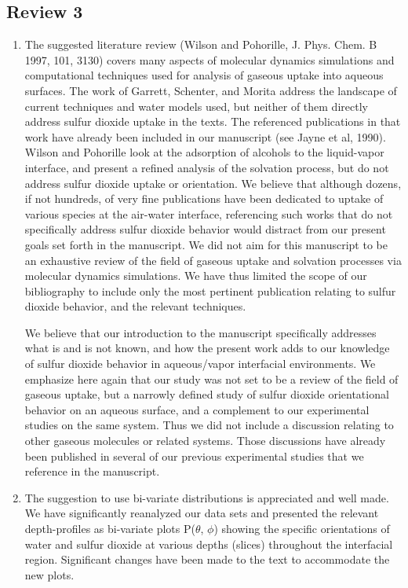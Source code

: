 \documentclass{article}
\begin{document}
\subsection*{Review 3}
\begin{enumerate}
\item The suggested literature review (Wilson and Pohorille, J. Phys. Chem. B 1997, 101, 3130) covers many aspects of molecular dynamics simulations and computational techniques used for analysis of gaseous uptake into aqueous surfaces. The work of Garrett, Schenter, and Morita address the landscape of current techniques and water models used, but neither of them directly address sulfur dioxide uptake in the texts. The referenced publications in that work have already been included in our manuscript (see Jayne et al, 1990). Wilson and Pohorille look at the adsorption of alcohols to the liquid-vapor interface, and present a refined analysis of the solvation process, but do not address sulfur dioxide uptake or orientation. We believe that although dozens, if not hundreds, of very fine publications have been dedicated to uptake of various species at the air-water interface, referencing such works that do not specifically address sulfur dioxide behavior would distract from our present goals set forth in the manuscript. We did not aim for this manuscript to be an exhaustive review of the field of gaseous uptake and solvation processes via molecular dynamics simulations. We have thus limited the scope of our bibliography to include only the most pertinent publication relating to sulfur dioxide behavior, and the relevant techniques.

We believe that our introduction to the manuscript specifically addresses what is and is not known, and how the present work adds to our knowledge of sulfur dioxide behavior in aqueous/vapor interfacial environments. We emphasize here again that our study was not set to be a review of the field of gaseous uptake, but a narrowly defined study of sulfur dioxide orientational behavior on an aqueous surface, and a complement to our experimental studies on the same system. Thus we did not include a discussion relating to other gaseous molecules or related systems. Those discussions have already been published in several of our previous experimental studies that we reference in the manuscript.

\item The suggestion to use bi-variate distributions is appreciated and well made. We have significantly reanalyzed our data sets and presented the relevant depth-profiles as bi-variate plots P($\theta$, $\phi$) showing the specific orientations of water and sulfur dioxide at various depths (slices) throughout the interfacial region. Significant changes have been made to the text to accommodate the new plots.


\end{enumerate}
\end{document}
